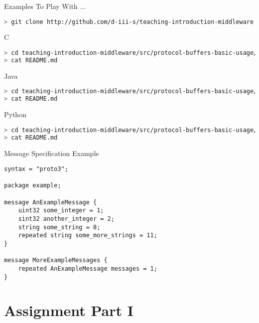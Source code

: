 \begin{frame}[fragile]{Examples To Play With ...}
\begin{lstlisting}[language=bash,style=mini]
> git clone http://github.com/d-iii-s/teaching-introduction-middleware.git
\end{lstlisting}
    \begin{block}{C}
\begin{lstlisting}[language=bash,style=mini]
> cd teaching-introduction-middleware/src/protocol-buffers-basic-usage/c
> cat README.md
\end{lstlisting}
    \end{block}
    \begin{block}{Java}
\begin{lstlisting}[language=bash,style=mini]
> cd teaching-introduction-middleware/src/protocol-buffers-basic-usage/java
> cat README.md
\end{lstlisting}
    \end{block}
    \begin{block}{Python}
\begin{lstlisting}[language=bash,style=mini]
> cd teaching-introduction-middleware/src/protocol-buffers-basic-usage/python
> cat README.md
\end{lstlisting}
    \end{block}
\end{frame}


\begin{frame}[fragile]{Message Specification Example}
\begin{lstlisting}[style=mini]
syntax = "proto3";

package example;

message AnExampleMessage {
    uint32 some_integer = 1;
    sint32 another_integer = 2;
    string some_string = 8;
    repeated string some_more_strings = 11;
}

message MoreExampleMessages {
    repeated AnExampleMessage messages = 1;
}
\end{lstlisting}
\end{frame}


\section{Assignment Part I}


